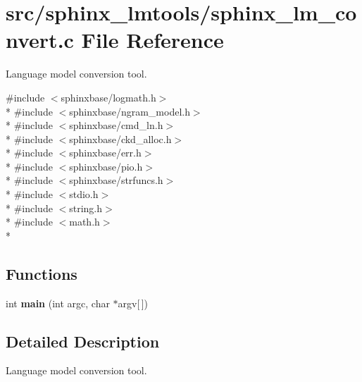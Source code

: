 \section{src/sphinx\+\_\+lmtools/sphinx\+\_\+lm\+\_\+convert.c File Reference}
\label{sphinx__lm__convert_8c}


Language model conversion tool.  


{\ttfamily \#include $<$sphinxbase/logmath.\+h$>$}\\*
{\ttfamily \#include $<$sphinxbase/ngram\+\_\+model.\+h$>$}\\*
{\ttfamily \#include $<$sphinxbase/cmd\+\_\+ln.\+h$>$}\\*
{\ttfamily \#include $<$sphinxbase/ckd\+\_\+alloc.\+h$>$}\\*
{\ttfamily \#include $<$sphinxbase/err.\+h$>$}\\*
{\ttfamily \#include $<$sphinxbase/pio.\+h$>$}\\*
{\ttfamily \#include $<$sphinxbase/strfuncs.\+h$>$}\\*
{\ttfamily \#include $<$stdio.\+h$>$}\\*
{\ttfamily \#include $<$string.\+h$>$}\\*
{\ttfamily \#include $<$math.\+h$>$}\\*
\subsection*{Functions}
\begin{DoxyCompactItemize}
\item 
int {\bfseries main} (int argc, char $\ast$argv[$\,$])\label{sphinx__lm__convert_8c_a0ddf1224851353fc92bfbff6f499fa97}

\end{DoxyCompactItemize}


\subsection{Detailed Description}
Language model conversion tool. 

